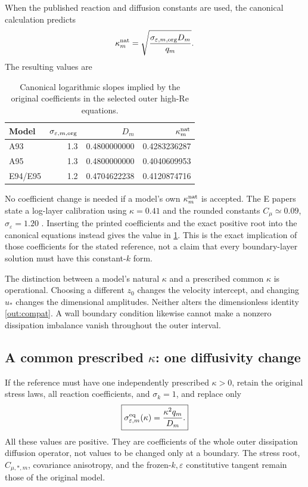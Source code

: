 \documentclass[11pt,a4paper]{article}
\numberwithin{equation}{section}
\newcommand{\eps}{\varepsilon}
\newcommand{\ust}{u_*}
\begin{document}
When the published reaction and diffusion constants are used, the
canonical calculation predicts
\begin{equation}
 \kappa_m^{\rm nat}
 =\sqrt{\frac{\sigma_{\eps,m,\rm org}D_m}{q_m}}.
 \label{out:kappanatural}
\end{equation}
The resulting values are
\begin{table}[htbp]
\centering
\caption{Canonical logarithmic slopes implied by the original
coefficients in the selected outer high-Re equations.}
\label{out:kappatable}
\begin{tabular}{lrrr}
\toprule
Model & $\sigma_{\eps,m,\rm org}$ & $D_m$ & $\kappa_m^{\rm nat}$\\
\midrule
A93 & 1.3 & 0.4800000000 & 0.4283236287\\
A95 & 1.3 & 0.4800000000 & 0.4040609953\\
E94/E95 & 1.2 & 0.4704622238 & 0.4120874716\\
\bottomrule
\end{tabular}
\end{table}
No coefficient change is needed if a model's own
$\kappa_m^{\rm nat}$ is accepted. The E papers state a log-layer
calibration using $\kappa=0.41$ and the rounded constants
$C_\mu\simeq0.09$, $\sigma_\eps=1.20$
\citep[Eq.~(28) and Table~2]{Shih1995EVM}. Inserting the printed
coefficients and the exact positive root into the canonical equations
instead gives the value in \cref{out:kappatable}. This is the exact
implication of those coefficients for the stated reference, not a claim
that every boundary-layer solution must have this constant-$k$ form.

The distinction between a model's natural $\kappa$ and a prescribed
common $\kappa$ is operational. Choosing a different $z_0$ changes the
velocity intercept, and changing $\ust$ changes the dimensional
amplitudes. Neither alters the dimensionless identity
\cref{out:compat}. A wall boundary condition likewise cannot make a
nonzero dissipation imbalance vanish throughout the outer interval.

\subsection{A common prescribed \texorpdfstring{$\kappa$}{kappa}: one diffusivity change}
\label{out:minimalchange}

If the reference must have one independently prescribed
$\kappa>0$, retain the original stress laws, all reaction coefficients,
and $\sigma_k=1$, and replace only
\begin{equation}
 \boxed{\sigma_{\eps,m}^{\rm eq}(\kappa)
       =\frac{\kappa^2q_m}{D_m}.}
 \label{out:sigma}
\end{equation}
All these values are positive. They are coefficients of the whole
outer dissipation diffusion operator, not values to be changed only
at a boundary. The stress root, $C_{\mu,*,m}$, covariance anisotropy,
and the frozen-$k,\eps$ constitutive tangent remain those of the
original model.
\end{document}
